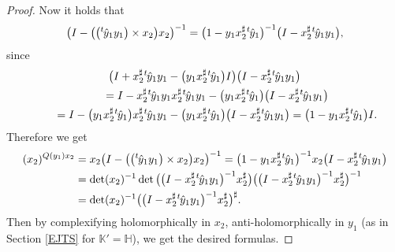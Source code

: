 \documentclass[pdftex]{sigma}
\numberwithin{equation}{section}
\newcommand{\BH}{\mathbb{H}}
\newcommand{\BK}{\mathbb{K}}
\begin{document}
\begin{proof}
Now it holds that
\begin{gather*} \big(I-\big(\big({}^t\hspace{-1pt}\hat{y}_1y_1\big)\times x_2\big)x_2\big)^{-1}
=\big(1-y_1x_2^\sharp{}^t\hspace{-1pt}\hat{y}_1\big)^{-1}\big(I-x_2^\sharp{}^t\hspace{-1pt}\hat{y}_1y_1\big), \end{gather*}
since
\begin{gather*}
 \big(I+x_2^\sharp{}^t\hspace{-1pt}\hat{y}_1y_1-\big(y_1x_2^\sharp{}^t\hspace{-1pt}\hat{y}_1\big)I\big)
\big(I-x_2^\sharp{}^t\hspace{-1pt}\hat{y}_1y_1\big) \\
\qquad{} =I-x_2^\sharp{}^t\hspace{-1pt}\hat{y}_1y_1x_2^\sharp{}^t\hspace{-1pt}\hat{y}_1y_1
-\big(y_1x_2^\sharp{}^t\hspace{-1pt}\hat{y}_1\big)\big(I-x_2^\sharp{}^t\hspace{-1pt}\hat{y}_1y_1\big) \\
\qquad{} =I-\big(y_1x_2^\sharp{}^t\hspace{-1pt}\hat{y}_1\big)x_2^\sharp{}^t\hspace{-1pt}\hat{y}_1y_1
-\big(y_1x_2^\sharp{}^t\hspace{-1pt}\hat{y}_1\big)\big(I-x_2^\sharp{}^t\hspace{-1pt}\hat{y}_1y_1\big)
=\big(1-y_1x_2^\sharp{}^t\hspace{-1pt}\hat{y}_1\big)I.
\end{gather*}
Therefore we get
\begin{align*}
(x_2)^{Q(y_1)x_2}&=x_2\big(I-\big(\big({}^t\hspace{-1pt}\hat{y}_1y_1\big)\times x_2\big)x_2\big)^{-1}
=\big(1-y_1x_2^\sharp{}^t\hspace{-1pt}\hat{y}_1\big)^{-1}x_2\big(I-x_2^\sharp{}^t\hspace{-1pt}\hat{y}_1y_1\big) \\
&=\det(x_2)^{-1}\det\big(\big(I-x_2^\sharp{}^t\hspace{-1pt}\hat{y}_1y_1\big)^{-1}x_2^\sharp\big)
\big(\big(I-x_2^\sharp{}^t\hspace{-1pt}\hat{y}_1y_1\big)^{-1}x_2^\sharp\big)^{-1} \\
&=\det(x_2)^{-1}\big(\big(I-x_2^\sharp{}^t\hspace{-1pt}\hat{y}_1y_1\big)^{-1}x_2^\sharp\big)^\sharp.
\end{align*}
Then by complexifying holomorphically in $x_2$, anti-holomorphically in $y_1$
(as in Section \ref{EJTS} for $\BK'=\BH$), we get the desired formulas.
\end{proof}
\end{document}
